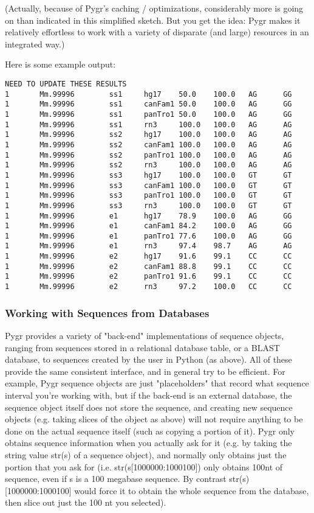 \documentclass{howto}
\begin{document}
(Actually, because of Pygr's caching / optimizations, considerably more is going on than indicated in this simplified sketch.  But you get the idea: Pygr makes it relatively effortless to work with a variety of disparate (and large) resources in an integrated way.)

Here is some example output:
\begin{verbatim}
NEED TO UPDATE THESE RESULTS
1       Mm.99996        ss1     hg17    50.0    100.0   AG      GG
1       Mm.99996        ss1     canFam1 50.0    100.0   AG      GG
1       Mm.99996        ss1     panTro1 50.0    100.0   AG      GG
1       Mm.99996        ss1     rn3     100.0   100.0   AG      AG
1       Mm.99996        ss2     hg17    100.0   100.0   AG      AG
1       Mm.99996        ss2     canFam1 100.0   100.0   AG      AG
1       Mm.99996        ss2     panTro1 100.0   100.0   AG      AG
1       Mm.99996        ss2     rn3     100.0   100.0   AG      AG
1       Mm.99996        ss3     hg17    100.0   100.0   GT      GT
1       Mm.99996        ss3     canFam1 100.0   100.0   GT      GT
1       Mm.99996        ss3     panTro1 100.0   100.0   GT      GT
1       Mm.99996        ss3     rn3     100.0   100.0   GT      GT
1       Mm.99996        e1      hg17    78.9    100.0   AG      GG
1       Mm.99996        e1      canFam1 84.2    100.0   AG      GG
1       Mm.99996        e1      panTro1 77.6    100.0   AG      GG
1       Mm.99996        e1      rn3     97.4    98.7    AG      AG
1       Mm.99996        e2      hg17    91.6    99.1    CC      CC
1       Mm.99996        e2      canFam1 88.8    99.1    CC      CC
1       Mm.99996        e2      panTro1 91.6    99.1    CC      CC
1       Mm.99996        e2      rn3     97.2    100.0   CC      CC
\end{verbatim}

\subsubsection{Working with Sequences from Databases}

Pygr provides a variety of "back-end" implementations of sequence objects, ranging from sequences stored in a relational database table, or a BLAST database, to sequences created by the user in Python (as above).  All of these provide the same consistent interface, and in general try to be efficient.  For example, Pygr sequence objects are just "placeholders" that record what sequence interval you're working with, but if the back-end is an external database, the sequence object itself does not store the sequence, and creating new sequence objects (e.g. taking slices of the object as above) will not require anything to be done on the actual sequence itself (such as copying a portion of it).  Pygr only obtains sequence information when you actually ask for it (e.g. by taking the string value str(s) of a sequence object), and normally only obtains just the portion that you ask for (i.e. str(s[1000000:1000100]) only obtains 100nt of sequence, even if s is a 100 megabase sequence.  By contrast str(s)[1000000:1000100] would force it to obtain the whole sequence from the database, then slice out just the 100 nt you selected). 
\end{document}
